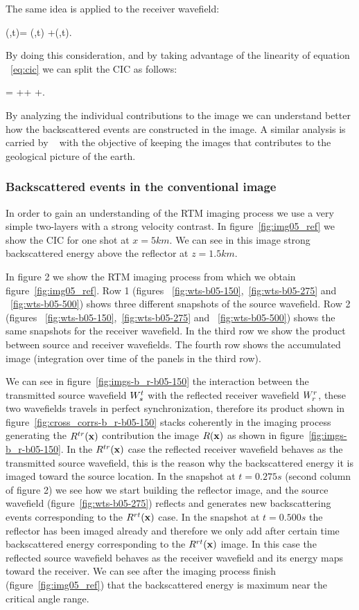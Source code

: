 The same idea is applied to the receiver wavefield:

\beq
\UR(\xx,t)= \URr(\xx,t) +\URt(\xx,t).
\label{eq:rsplit}
\eeq

By doing this consideration, and by taking advantage of the linearity of equation ~\ref{eq:cic}  we
can split the CIC as follows:

\beq
\R= ++  +.
\label{eq:cicsplit}
\eeq

By analyzing the individual contributions to the image we can understand better how the backscattered events
are constructed in the image. A similar analysis is carried by ~\citep{fei:3130,liu:S29} with the objective
of keeping the images that contributes to the geological picture of the earth.

\subsubsection{Backscattered events in the conventional image}

In order to gain an understanding of the RTM imaging process we use a very simple two-layers with a strong velocity
contrast. In figure~\ref{fig:img05_ref} we show the CIC for one shot at $x=5km$. We can see in this image strong 
backscattered energy above the reflector at $z=1.5km$.

In figure 2 we show the RTM imaging process from which we obtain figure~\ref{fig:img05_ref}. Row 1 
(figures ~\ref{fig:wts-b05-150},~\ref{fig:wts-b05-275} and ~\ref{fig:wts-b05-500}) shows three different snapshots
of the source wavefield. Row 2 (figures ~\ref{fig:wts-b05-150},~\ref{fig:wts-b05-275} and ~\ref{fig:wts-b05-500}) 
shows the same snapshots for the receiver wavefield. In the third row we show the product between
source and receiver wavefields. The fourth row shows the accumulated image (integration over time of the panels
in the third row).

We can see in figure~\ref{fig:imgs-b_r-b05-150} the interaction between the transmitted source wavefield ${W_s^t}$ with 
the reflected receiver wavefield ${W_r^r}$, these two wavefields travels in perfect synchronization, therefore its product 
shown in figure~\ref{fig:cross_corrs-b_r-b05-150} stacks coherently in the imaging process generating the $R^{tr}({\bf x})$ 
contribution the image $R({\bf x})$ as shown in figure~\ref{fig:imgs-b_r-b05-150}. In the $R^{tr}({\bf x})$ case the reflected 
receiver wavefield behaves as the transmitted source wavefield, this is the reason why the backscattered energy 
it is imaged toward the source location. 
In the snapshot at $t=0.275s$ (second column of figure 2) we see how we start building the reflector image,
 and the source wavefield (figure~\ref{fig:wts-b05-275}) reflects and generates new backscattering events
 corresponding to the  $R^{rt}({\bf x})$ case. In the snapshot at $t=0.500s$ the reflector has been imaged already and 
therefore we only add after certain time backscattered energy corresponding to the $R^{rt}({\bf x})$ image. In this case the 
reflected source wavefield behaves as the receiver wavefield and its energy maps toward the receiver. We can see after
 the imaging process finish (figure~\ref{fig:img05_ref}) that the backscattered energy is maximum near the critical
 angle range.

